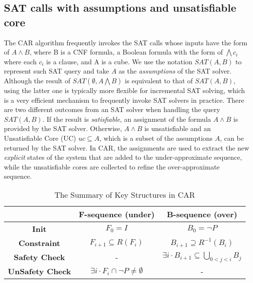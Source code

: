 \subsection{SAT calls with assumptions and unsatisfiable core}
The CAR algorithm frequently invokes the SAT calls whose inputs have the form of $A\wedge B$, where B is a CNF formula, a Boolean formula with the form of $\bigwedge c_i$ where each $c_i$ is a clause, and A is a cube. We use the notation $SAT(A, B)$ to represent such SAT query and take $A$ as the \emph{assumptions} of the SAT solver. Although the result of $SAT(\emptyset,A \bigwedge B)$ is equivalent to that of $SAT(A,B)$, using the latter one is typically more flexible for incremental SAT solving, which is a very efficient mechanism to frequently invoke SAT solvers in practice.   
There are two different outcomes from an SAT solver when handling the query $SAT (A, B)$. If the result is \emph{satisfiable}, an assignment of the formula $A\wedge B$ is provided by the SAT solver. Otherwise, $A\wedge B$ is unsatisfiable and an Unsatisfiable Core (UC) $uc\subseteq A$, which is a subset of the assumptions $A$, can be returned by the SAT solver. In CAR, the assignments are used to extract the new \emph{explicit} states of the system that are added to the under-approximate sequence, while the unsatisfiable cores are collected to refine the over-approximate sequence. 


\begin{table}
\caption{The Summary of Key Structures in CAR}\label{tab:car}
\begin{tabular}{|c|c|c|} %
\hline 
&\textbf{F-sequence (under)}&\textbf{B-sequence (over)}\\
\hline  
\textbf{Init}&$F_{0}=I$&$B_{0}=\neg P$\\
\hline
\textbf{Constraint}&$F_{i+1}\subseteq R(F_{i})$&$B_{i+1}\supseteq R^{-1}(B_{i})$ \\
\hline
\textbf{Safety Check}&-&$\exists i\cdot B_{i+1}\subseteq \bigcup_{0<j<i}B_{j}$ \\
\hline
\textbf{UnSafety Check}&$\exists i\cdot F_{i}\cap \neg P \neq \emptyset$&- \\
\hline
\end{tabular}
\end{table}


